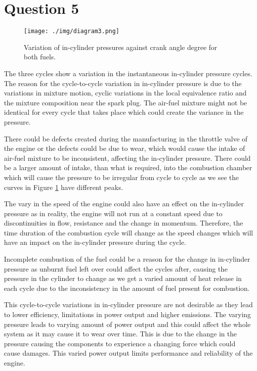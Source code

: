 \section{Question 5}
\begin{figure}[H]
    \centering
    \texttt{[image: ./img/diagram3.png]}
    \caption{Variation of in-cylinder pressures against crank angle degree for both fuels.}
    \label{q5-f1}
\end{figure}
The three cycles show a variation in the instantaneous in-cylinder pressure cycles. The reason for the cycle-to-cycle variation in in-cylinder pressure is due to the variations in mixture motion, cyclic variations in the local equivalence ratio and the mixture composition near the spark plug. The air-fuel mixture might not be identical for every cycle that takes place which could create the variance in the pressure.

There could be defects created during the manufacturing in the throttle valve of the engine or the defects could be due to wear, which would cause the intake of air-fuel mixture to be inconsistent, affecting the in-cylinder pressure. There could be a larger amount of intake, than what is required, into the combustion chamber which will cause the pressure to be irregular from cycle to cycle as we see the curves in Figure \ref{q5-f1} have different peaks.

The vary in the speed of the engine could also have an effect on the in-cylinder pressure as in reality, the engine will not run at a constant speed due to discontinuities in flow, resistance and the change in momentum. Therefore, the time duration of the combustion cycle will change as the speed changes which will have an impact on the in-cylinder pressure during the cycle.

Incomplete combustion of the fuel could be a reason for the change in in-cylinder pressure as unburnt fuel left over could affect the cycles after, causing the pressure in the cylinder to change as we get a varied amount of heat release in each cycle due to the inconsistency in the amount of fuel present for combustion.

This cycle-to-cycle variations in in-cylinder pressure are not desirable as they lead to lower efficiency, limitations in power output and higher emissions. The varying pressure leads to varying amount of power output and this could affect the whole system as it may cause it to wear over time. This is due to the change in the pressure causing the components to experience a changing force which could cause damages. This varied power output limits performance and reliability of the engine.
